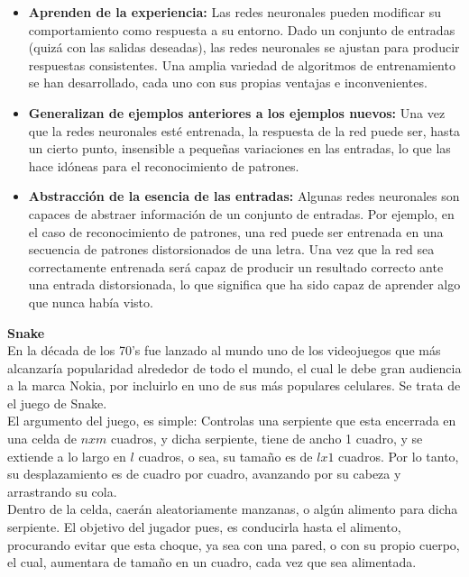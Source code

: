 \documentclass[12pt]{article}
\begin{document}
        \begin{itemize}
            \item {\bf Aprenden  de  la  experiencia:}  Las  redes neuronales  pueden  modificar  su  comportamiento  como respuesta a su entorno. Dado un conjunto de entradas (quizá con las salidas deseadas),  las  redes neuronales  se  ajustan  para  producir  respuestas  consistentes.  Una  amplia  variedad  de  algoritmos  de  entrenamiento  se  han  desarrollado,  cada  uno  con  sus  propias ventajas e inconvenientes. 
            
            \item {\bf Generalizan  de  ejemplos  anteriores  a  los  ejemplos  nuevos:}  Una  vez  que  la  redes neuronales  esté  entrenada,  la  respuesta  de  la  red  puede  ser,  hasta  un  cierto  punto,  insensible a pequeñas variaciones en las entradas, lo que las hace idóneas para el reconocimiento de patrones. 
            \item {\bf Abstracción  de  la  esencia  de  las  entradas:} Algunas  redes neuronales  son  capaces  de  abstraer  información  de  un  conjunto  de  entradas.  Por  ejemplo,  en  el  caso  de  reconocimiento  de  patrones,  una  red  puede  ser  entrenada  en  una  secuencia  de  patrones  distorsionados  de  una  letra.  Una  vez  que  la  red  sea  correctamente  entrenada   será   capaz   de   producir   un   resultado   correcto   ante   una   entrada   distorsionada, lo que significa que ha sido capaz de aprender algo que nunca había visto.
            \end{itemize}
            
        {\bf Snake}\\
        
        En la década de los 70's fue lanzado al mundo uno de los videojuegos que más alcanzaría popularidad alrededor de todo el mundo, el cual le debe gran audiencia a la marca Nokia, por incluirlo en uno de sus más populares celulares. Se trata de el juego de Snake.\\
        
        El argumento del juego, es simple: Controlas una serpiente que esta encerrada en una celda de $n x m$ cuadros, y dicha serpiente, tiene de ancho 1 cuadro, y se extiende a lo largo en $l$ cuadros, o sea, su tamaño es de $l x 1$ cuadros. Por lo tanto, su desplazamiento es de cuadro por cuadro, avanzando por su cabeza y arrastrando su cola.\\
        
        Dentro de la celda, caerán aleatoriamente manzanas, o algún alimento para dicha serpiente. El objetivo del jugador pues, es conducirla hasta el alimento, procurando evitar que esta choque, ya sea con una pared, o con su propio cuerpo, el cual, aumentara de tamaño en un cuadro, cada vez que sea alimentada.\\
        
\end{document}
